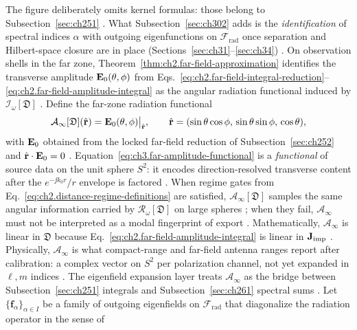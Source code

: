 The figure deliberately omits
kernel formulas: those belong to Subsection~\ref{sec:ch251} \cite{stratton1941}. What Subsection~\ref{sec:ch302}
adds is the \emph{identification} of spectral indices \(\alpha\) with outgoing eigenfunctions on
\(\mathcal{F}_{\mathrm{rad}}\) once separation and Hilbert-space closure are in place
(Sections~\ref{sec:ch31}--\ref{sec:ch34}) \cite{harrington2001}.
On observation shells in the far zone, Theorem~\ref{thm:ch2.far-field-approximation} identifies the
transverse amplitude \(\mathbf{E}_0(\theta,\phi)\) from
Eqs.~\eqref{eq:ch2.far-field-integral-reduction}--\eqref{eq:ch2.far-field-amplitude-integral}
as the angular radiation functional induced by \(\mathcal{I}_\omega[\mathfrak{D}]\)
\cite{stratton1941}. Define the far-zone radiation functional
\begin{equation}
\label{eq:ch3.far-amplitude-functional}
\mathcal{A}_\infty[\mathfrak{D}](\hat{\mathbf{r}})
=
\mathbf{E}_0(\theta,\phi)\big|_{\hat{\mathbf{r}}},
\qquad
\hat{\mathbf{r}}=(\sin\theta\cos\phi,\,\sin\theta\sin\phi,\,\cos\theta),
\end{equation}
with \(\mathbf{E}_0\) obtained from the locked far-field reduction of Subsection~\ref{sec:ch252} and
\(\hat{\mathbf{r}}\cdot\mathbf{E}_0=0\) \cite{stratton1941}. Equation~\eqref{eq:ch3.far-amplitude-functional}
is a \emph{functional} of source data on the unit sphere \(S^{2}\): it encodes direction-resolved
transverse content after the \(e^{-\jj k_0 r}/r\) envelope is factored \cite{jackson1999}. When
regime gates from Eq.~\eqref{eq:ch2.distance-regime-definitions} are satisfied,
\(\mathcal{A}_\infty[\mathfrak{D}]\) samples the same angular information carried by
\(\mathcal{R}_\omega[\mathfrak{D}]\) on large spheres \cite{stratton1941}; when
they fail, \(\mathcal{A}_\infty\) must not be interpreted as a modal fingerprint of export
\cite{harrington2001}.
Mathematically, \(\mathcal{A}_\infty\) is linear in \(\mathfrak{D}\) because
Eq.~\eqref{eq:ch2.far-field-amplitude-integral} is linear in \({\mathbf{J}_{\mathrm{imp}}}\)
\cite{stratton1941}. Physically, \(\mathcal{A}_\infty\) is what compact-range and far-field
antenna ranges report after calibration: a complex vector on \(S^{2}\) per polarization channel,
not yet expanded in \(\ell,m\) indices \cite{harrington2001}. The eigenfield expansion layer treats
\(\mathcal{A}_\infty\) as the bridge between Subsection~\ref{sec:ch251} integrals and
Subsection~\ref{sec:ch261} spectral sums \cite{stratton1941}.
Let \(\{\mathbf{f}_\alpha\}_{\alpha\in I}\) be a family of outgoing eigenfields on
\(\mathcal{F}_{\mathrm{rad}}\) that diagonalize the radiation operator in the sense of
